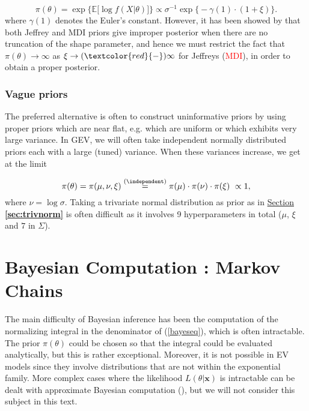 \begin{equation*}
\pi(\theta)= \exp\Big\{ \mathbb{E}\big[\log f(X|\theta
)\big]\Big\} \propto \sigma^{-1}\exp\Big\{-\gamma(1)\cdot (1+\xi)\Big\}.
\end{equation*}
where $\gamma(1)$ denotes the Euler's constant.
However, it has been showed by \cite{northrop_posterior_2016} that 
both Jeffrey and MDI priors give improper posterior when there are no truncation of the shape parameter, and hence we must restrict the fact that $\pi(\theta)\rightarrow\infty$ as $\xi\rightarrow(\textcolor{red}{-})\infty$ for Jeffreys (\textcolor{red}{MDI}), in order to obtain a proper posterior.

\subsubsection*{Vague priors}
The preferred alternative is often to construct uninformative priors by using proper priors which are near flat, e.g. which are uniform or which exhibits very large variance.
In GEV, we will often take independent normally distributed priors each with a large (tuned) variance. When these variances increase, we get at the limit

\begin{equation}
\pi(\theta)=\pi(\mu,\nu,\xi)\stackrel{(\independent)}{=}\pi(\mu)\cdot\pi(\nu)\cdot\pi(\xi)\ \propto 1,
\end{equation}
where $\nu= \log\sigma$.
Taking a trivariate normal distribution as prior as in \hyperref[sec:trivnorm]{Section \textbf{\ref{sec:trivnorm}}} is often difficult as it involves 9 hyperparameters in total ($\mu$, $\xi$ and $7$ in $\Sigma$).




\section{Bayesian Computation : Markov Chains}\label{sec:baymcmc}

The main difficulty of Bayesian inference has been the computation of the normalizing integral in the denominator of (\ref{bayeseq}), which is often intractable. The prior $\pi(\theta)$ could be chosen so that the integral could be evaluated analytically, but this is rather exceptional. Moreover, it is not possible in EV models since they involve distributions that are not within the exponential family. 
More complex cases where the likelihood $L(\theta|\boldsymbol{x})$ is intractable can be dealt with approximate Bayesian computation (\citet{Beaumont2025}), but we will not consider this subject in this text.


